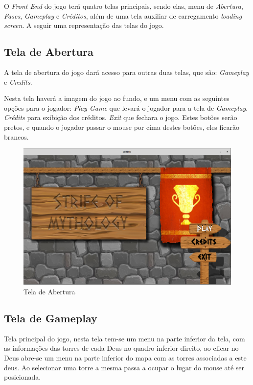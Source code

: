 \documentclass[11pt]{article} %
\begin{document}
O \textit{Front End} do jogo terá  quatro telas principais, sendo elas, menu de \textit{Abertura}, \textit{Fases}, \textit{Gameplay} e \textit{Créditos}, além de uma tela auxiliar de carregamento \textit{loading screen}. A seguir uma representação das telas do jogo.

\subsection{Tela de Abertura}
A tela de abertura do jogo dará acesso para outras duas telas, que são: \textit{Gameplay} e \textit{Credits}.

Nesta tela haverá a imagem do jogo ao fundo, e um menu com as seguintes opções para o jogador: 
\textit{Play Game} que levará o jogador para a tela de \textit{Gameplay}.
\textit{Crédits} para exibição dos créditos.
\textit{Exit} que fechara o jogo.
Estes botões serão pretos, e quando o jogador passar o mouse por cima destes botões, eles ficarão brancos.\\

\begin{figure}[!htp]
\centering
\includegraphics[scale=0.4]{res/menu_display.png}
\caption{Tela de Abertura}
\label{Abertura}
\end{figure}

\newpage

\subsection{Tela de Gameplay}

Tela principal do jogo, nesta tela tem-se um menu na parte inferior da tela, com as informações das torres de cada Deus no quadro inferior direito, ao clicar no Deus abre-se um menu na parte inferior do mapa com as torres associadas a este deus. Ao selecionar uma torre a mesma passa a ocupar o lugar do mouse até ser posicionada.
\end{document}
